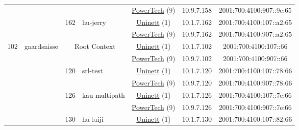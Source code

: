 \begin{small}
\begin{center}
\begin{longtable}{|c|c|c|c|c|c|c|c|}
  &  &  &  & \multicolumn{2}{|c|}{\tiny{\href{http://www.powertech.no}{PowerTech} (9)}} & \tiny{10.9.7.158} & \tiny{2001:700:4100:907::9e:65} \\* \cline{3-3}\cline{4-4}\cline{5-5}\cline{6-6}\cline{7-7}\cline{8-8}
  &  & \multirow{2}{*}{\tiny{162}} & \multicolumn{1}{|l|}{\multirow{2}{*}{\tiny{hu-jerry}}} & \multicolumn{2}{|c|}{\tiny{\href{https://www.uninett.no}{Uninett} (1)}} & \tiny{10.1.7.162} & \tiny{2001:700:4100:107::a2:65} \\* \cline{5-5}\cline{6-6}\cline{7-7}\cline{8-8}
  &  &  &  & \multicolumn{2}{|c|}{\tiny{\href{http://www.powertech.no}{PowerTech} (9)}} & \tiny{10.9.7.162} & \tiny{2001:700:4100:907::a2:65} \\ \hline
 \multirow{26}{*}{\tiny{102}} & \multicolumn{1}{|l|}{\multirow{26}{*}{\tiny{gaardsnisse}}} & \multicolumn{2}{|c|}{\multirow{2}{*}{\tiny{Root Context}}} & \multicolumn{2}{|c|}{\tiny{\href{https://www.uninett.no}{Uninett} (1)}} & \tiny{10.1.7.102} & \tiny{2001:700:4100:107::66} \\* \cline{5-5}\cline{6-6}\cline{7-7}\cline{8-8}
  &  & \multicolumn{2}{|c|}{} & \multicolumn{2}{|c|}{\tiny{\href{http://www.powertech.no}{PowerTech} (9)}} & \tiny{10.9.7.102} & \tiny{2001:700:4100:907::66} \\* \cline{3-3}\cline{4-4}\cline{5-5}\cline{6-6}\cline{7-7}\cline{8-8}
  &  & \multirow{2}{*}{\tiny{120}} & \multicolumn{1}{|l|}{\multirow{2}{*}{\tiny{srl-test}}} & \multicolumn{2}{|c|}{\tiny{\href{https://www.uninett.no}{Uninett} (1)}} & \tiny{10.1.7.120} & \tiny{2001:700:4100:107::78:66} \\* \cline{5-5}\cline{6-6}\cline{7-7}\cline{8-8}
  &  &  &  & \multicolumn{2}{|c|}{\tiny{\href{http://www.powertech.no}{PowerTech} (9)}} & \tiny{10.9.7.120} & \tiny{2001:700:4100:907::78:66} \\* \cline{3-3}\cline{4-4}\cline{5-5}\cline{6-6}\cline{7-7}\cline{8-8}
  &  & \multirow{2}{*}{\tiny{126}} & \multicolumn{1}{|l|}{\multirow{2}{*}{\tiny{kau-multipath}}} & \multicolumn{2}{|c|}{\tiny{\href{https://www.uninett.no}{Uninett} (1)}} & \tiny{10.1.7.126} & \tiny{2001:700:4100:107::7e:66} \\* \cline{5-5}\cline{6-6}\cline{7-7}\cline{8-8}
  &  &  &  & \multicolumn{2}{|c|}{\tiny{\href{http://www.powertech.no}{PowerTech} (9)}} & \tiny{10.9.7.126} & \tiny{2001:700:4100:907::7e:66} \\* \cline{3-3}\cline{4-4}\cline{5-5}\cline{6-6}\cline{7-7}\cline{8-8}
  &  & \multirow{2}{*}{\tiny{130}} & \multicolumn{1}{|l|}{\multirow{2}{*}{\tiny{hu-luiji}}} & \multicolumn{2}{|c|}{\tiny{\href{https://www.uninett.no}{Uninett} (1)}} & \tiny{10.1.7.130} & \tiny{2001:700:4100:107::82:66} \\* \cline{5-5}\cline{6-6}\cline{7-7}\cline{8-8}

\end{longtable}
\end{center}
\end{small}
